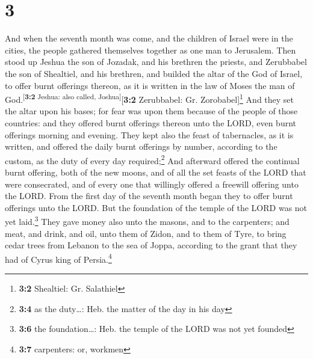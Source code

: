 \hypertarget{section-2}{%
\section{3}\label{section-2}}

 And when the seventh month was come, and the children of
Israel were in the cities, the people gathered themselves together as
one man to Jerusalem.  Then stood up Jeshua the son of
Jozadak, and his brethren the priests, and Zerubbabel the son of
Shealtiel, and his brethren, and builded the altar of the God of Israel,
to offer burnt offerings thereon, as it is written in the law of Moses
the man of God.\textsuperscript{{[}\textbf{3:2} Jeshua: also called,
Joshua{]}}{[}\textbf{3:2} Zerubbabel: Gr. Zorobabel{]}\footnote{\textbf{3:2}
  Shealtiel: Gr. Salathiel}  And they set the altar upon
his bases; for fear was upon them because of the people of those
countries: and they offered burnt offerings thereon unto the LORD, even
burnt offerings morning and evening.  They kept also the
feast of tabernacles, as it is written, and offered the daily burnt
offerings by number, according to the custom, as the duty of every day
required;\footnote{\textbf{3:4} as the duty\ldots: Heb. the matter of
  the day in his day}  And afterward offered the continual
burnt offering, both of the new moons, and of all the set feasts of the
LORD that were consecrated, and of every one that willingly offered a
freewill offering unto the LORD.  From the first day of
the seventh month began they to offer burnt offerings unto the LORD. But
the foundation of the temple of the LORD was not yet laid.\footnote{\textbf{3:6}
  the foundation\ldots: Heb. the temple of the LORD was not yet founded}
 They gave money also unto the masons, and to the
carpenters; and meat, and drink, and oil, unto them of Zidon, and to
them of Tyre, to bring cedar trees from Lebanon to the sea of Joppa,
according to the grant that they had of Cyrus king of Persia.\footnote{\textbf{3:7}
  carpenters: or, workmen}


